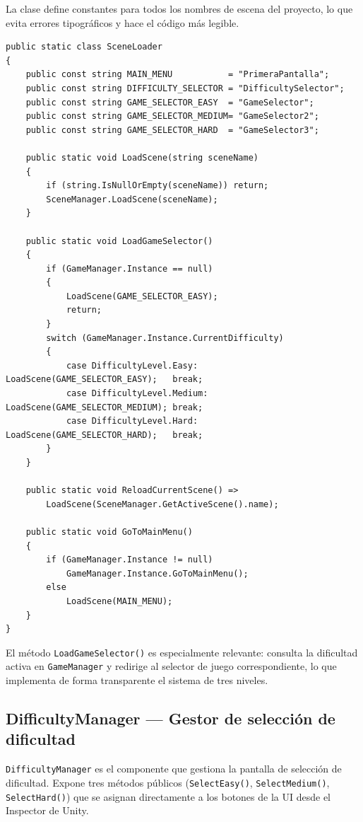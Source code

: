 \documentclass[12pt, a4paper]{report}
\begin{document}
La clase define constantes para todos los nombres de escena del proyecto,
lo que evita errores tipográficos y hace el código más legible.

\begin{lstlisting}[caption={SceneLoader.cs — Constantes de escena y navegación adaptativa},
                   label={lst:sceneloader}]
public static class SceneLoader
{
    public const string MAIN_MENU           = "PrimeraPantalla";
    public const string DIFFICULTY_SELECTOR = "DifficultySelector";
    public const string GAME_SELECTOR_EASY  = "GameSelector";
    public const string GAME_SELECTOR_MEDIUM= "GameSelector2";
    public const string GAME_SELECTOR_HARD  = "GameSelector3";

    public static void LoadScene(string sceneName)
    {
        if (string.IsNullOrEmpty(sceneName)) return;
        SceneManager.LoadScene(sceneName);
    }

    public static void LoadGameSelector()
    {
        if (GameManager.Instance == null)
        {
            LoadScene(GAME_SELECTOR_EASY);
            return;
        }
        switch (GameManager.Instance.CurrentDifficulty)
        {
            case DifficultyLevel.Easy:   LoadScene(GAME_SELECTOR_EASY);   break;
            case DifficultyLevel.Medium: LoadScene(GAME_SELECTOR_MEDIUM); break;
            case DifficultyLevel.Hard:   LoadScene(GAME_SELECTOR_HARD);   break;
        }
    }

    public static void ReloadCurrentScene() =>
        LoadScene(SceneManager.GetActiveScene().name);

    public static void GoToMainMenu()
    {
        if (GameManager.Instance != null)
            GameManager.Instance.GoToMainMenu();
        else
            LoadScene(MAIN_MENU);
    }
}
\end{lstlisting}

El método \texttt{LoadGameSelector()} es especialmente relevante: consulta
la dificultad activa en \texttt{GameManager} y redirige al selector de juego
correspondiente, lo que implementa de forma transparente el sistema de tres
niveles.

\subsection{DifficultyManager — Gestor de selección de dificultad}

\texttt{DifficultyManager} es el componente que gestiona la pantalla de
selección de dificultad. Expone tres métodos públicos
(\texttt{SelectEasy()}, \texttt{SelectMedium()}, \texttt{SelectHard()}) que
se asignan directamente a los botones de la UI desde el Inspector de Unity.
\end{document}
